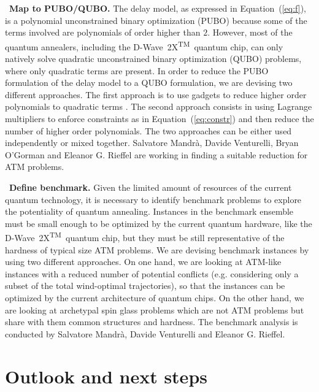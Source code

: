 \documentclass[9pt]{extarticle}
\newcommand{\equationname}{Equation}
\newcommand{\DW}{\mbox{D-Wave 2X\textsuperscript{TM}}~}
\begin{document}
\begin{changemargin}{0.5cm}{0cm}
\textbullet~\textbf{Map to PUBO/QUBO.} The delay model, as expressed in \equationname~(\ref{eq:f}), is a polynomial unconstrained binary optimization (PUBO)
because some of the terms involved are polynomials of order higher than $2$.
However, most of the quantum annealers, including the \DW quantum chip, can only natively solve quadratic unconstrained binary optimization (QUBO) problems,
where only quadratic terms are present.
In order to reduce the PUBO formulation of the delay model to a QUBO formulation, we are devising two different approaches.
The first approach is to use gadgets to reduce higher order polynomials to quadratic terms \cite{babbush:13}. The second approach consists in using Lagrange multipliers \cite{ronagh:15} to enforce constraints as in \equationname~(\ref{eq:constr}) and then reduce the number of higher order polynomials. The two approaches can be
either used independently or mixed together. Salvatore Mandr\`a, Davide Venturelli, Bryan O'Gorman and Eleanor G. Rieffel 
are working in finding a suitable reduction for ATM problems.
\end{changemargin}

\begin{changemargin}{0.5cm}{0cm}
\textbullet~\textbf{Define benchmark.} Given the limited amount of resources of the current quantum technology, it is necessary to identify benchmark problems to
explore the potentiality of quantum annealing. Instances in 
the benchmark ensemble must be small enough to be optimized by the current quantum hardware, like the \DW quantum chip,
but they must be still representative of the hardness of typical size ATM problems. We are devising benchmark instances by using two different approaches. On one
hand, we are looking at ATM-like instances with a reduced number of potential conflicts (e.g. considering only a subset of the total wind-optimal trajectories),
so that the instances can be optimized by the current architecture of quantum chips. On the other hand, we are looking at archetypal spin glass problems \cite{venturelli:15a}
which are not ATM problems but share with them common structures and hardness. The benchmark analysis 
is conducted by Salvatore Mandr\`a, Davide Venturelli and Eleanor G. Rieffel.
\end{changemargin}

\section*{Outlook and next steps}\label{sec:ass}
\end{document}
